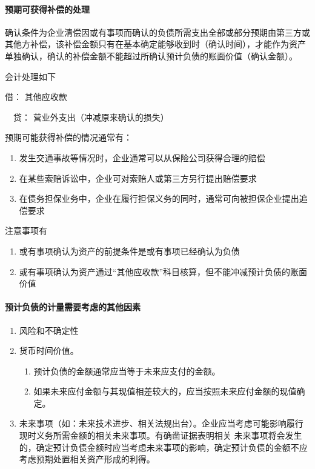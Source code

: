 \documentclass[UTF8,12pt]{ctexart}
\newenvironment{Dr}{\noindent 借：}{\par}
\newenvironment{Cr}{\noindent \ \ 贷：}{\par}
\numberwithin{equation}{section} %
\numberwithin{figure}{section}
\numberwithin{table}{section}
\begin{document}
	
	\paragraph{预期可获得补偿的处理}
	确认条件为企业清偿因或有事项而确认的负债所需支出全部或部分预期由第三方或其他方补偿，该补偿金额只有在基本确定能够收到时（确认时间），才能作为资产单独确认，确认的补偿金额不能超过所确认预计负债的账面价值（确认金额）。
	
	会计处理如下
	
	\begin{Dr}
		其他应收款
	\end{Dr}
	\begin{Cr}
		营业外支出（冲减原来确认的损失）
	\end{Cr}
	
	预期可能获得补偿的情况通常有：
	\begin{enumerate}
		\item 发生交通事故等情况时，企业通常可以从保险公司获得合理的赔偿
		
		\item 在某些索赔诉讼中，企业可对索赔人或第三方另行提出赔偿要求
		
		\item 在债务担保业务中，企业在履行担保义务的同时，通常可向被担保企业提出追偿要求
	\end{enumerate}
	
	注意事项有
	\begin{enumerate}
		\item 或有事项确认为资产的前提条件是或有事项已经确认为负债
		
		\item 或有事项确认为资产通过“其他应收款”科目核算，但不能冲减预计负债的账面价值
	\end{enumerate}
	
	\paragraph{预计负债的计量需要考虑的其他因素}
	\begin{enumerate}
		\item 风险和不确定性
		
		\item 货币时间价值。
		\begin{enumerate}
			\item 预计负债的金额通常应当等于未来应支付的金额。
			
			\item 如果未来应付金额与其现值相差较大的，应当按照未来应付金额的现值确定。
		\end{enumerate}
		
		\item 未来事项（如：未来技术进步、相关法规出台）。企业应当考虑可能影响履行现时义务所需金额的相关未来事项。有确凿证据表明相关  未来事项将会发生的，确定预计负债金额时应当考虑未来事项的影响，确定预计负债的金额不应考虑预期处置相关资产形成的利得。
		
		
	\end{enumerate}
	
\end{document}
